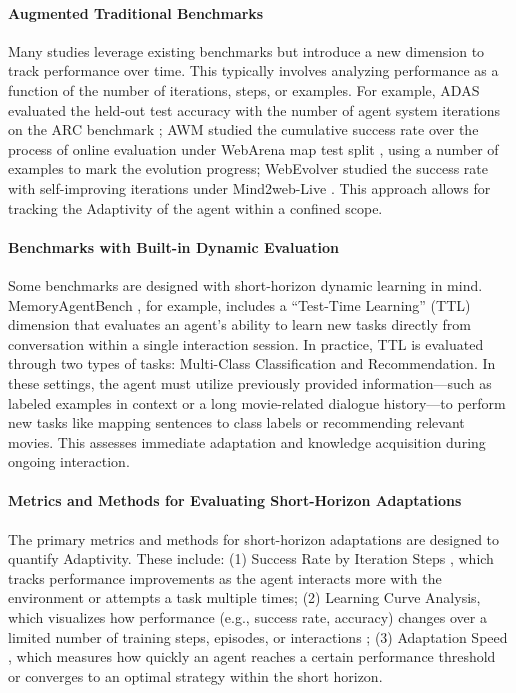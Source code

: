 \paragraph {Augmented Traditional Benchmarks} Many studies leverage existing benchmarks but introduce a new dimension to track performance over time. This typically involves analyzing performance as a function of the number of iterations, steps, or examples. For example, 
ADAS \citep{hu2024automated} evaluated the held-out test accuracy with the number of agent system iterations on the ARC benchmark \citep{chollet2019measure}; 
AWM \citep{wang2024agent} studied the cumulative success rate over the process of online evaluation under WebArena map test split \citep{zhou2023webarena}, using a number of examples to mark the evolution progress; WebEvolver \citep{fang2025webevolver} studied the success rate with self-improving iterations under Mind2web-Live \citep{pan2024webcanvas}.
This approach allows for tracking the Adaptivity of the agent within a confined scope. 

\paragraph{Benchmarks with Built-in Dynamic Evaluation} Some benchmarks are designed with short-horizon dynamic learning in mind. MemoryAgentBench \citep{hu2025evaluating}, for example, includes a ``Test-Time Learning'' (TTL) dimension that evaluates an agent's ability to learn new tasks directly from conversation within a single interaction session. In practice, TTL is evaluated through two types of tasks: Multi-Class Classification and Recommendation. In these settings, the agent must utilize previously provided information—such as labeled examples in context or a long movie-related dialogue history—to perform new tasks like mapping sentences to class labels or recommending relevant movies. This assesses immediate adaptation and knowledge acquisition during ongoing interaction.

\paragraph{Metrics and Methods for Evaluating Short-Horizon Adaptations} The primary metrics and methods for short-horizon adaptations are designed to quantify Adaptivity. These include: (1) Success Rate by Iteration Steps \citep{hu2024automated, wang2024agent, zheng2025lifelongagentbench}, which tracks performance improvements as the agent interacts more with the environment or attempts a task multiple times; (2) Learning Curve Analysis, which visualizes how performance (e.g., success rate, accuracy) changes over a limited number of training steps, episodes, or interactions \citep{hu2024automated, wang2024agent}; (3) Adaptation Speed \citep{wang2023voyager}, which measures how quickly an agent reaches a certain performance threshold or converges to an optimal strategy within the short horizon. 

